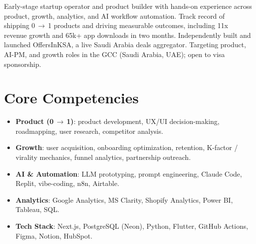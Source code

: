 \documentclass[11pt,a4paper,sans]{moderncv}
\begin{document}
\makecvtitle


\vspace{6pt}
\small{Early-stage startup operator and product builder with hands-on experience across product, growth, analytics, and AI workflow automation. Track record of shipping 0\,$\to$\,1 products and driving measurable outcomes, including 11x revenue growth and 65k+ app downloads in two months. Independently built and launched OffersInKSA, a live Saudi Arabia deals aggregator. Targeting product, AI-PM, and growth roles in the GCC (Saudi Arabia, UAE); open to visa sponsorship.}


\section{Core Competencies}
\vspace{1pt}
\begin{itemize}

\item \textbf{Product (0\,$\to$\,1)}: product development, UX/UI decision-making, roadmapping, user research, competitor analysis.

\item \textbf{Growth}: user acquisition, onboarding optimization, retention, K-factor / virality mechanics, funnel analytics, partnership outreach.

\item \textbf{AI \& Automation}: LLM prototyping, prompt engineering, Claude Code, Replit, vibe-coding, n8n, Airtable.

\item \textbf{Analytics}: Google Analytics, MS Clarity, Shopify Analytics, Power BI, Tableau, SQL.

\item \textbf{Tech Stack}: Next.js, PostgreSQL (Neon), Python, Flutter, GitHub Actions, Figma, Notion, HubSpot.

\end{itemize}

\end{document}
